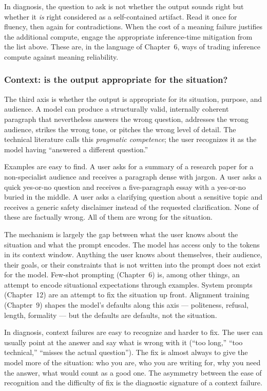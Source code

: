 In diagnosis, the question to ask is not whether the output sounds
right but whether it \emph{is} right considered as a self-contained
artifact. Read it once for fluency, then again for contradictions.
When the cost of a meaning failure justifies the additional
compute, engage the appropriate inference-time mitigation from the
list above. These are, in the language of Chapter~6, ways of
trading inference compute against meaning reliability.

\subsubsection{Context: is the output appropriate for the situation?}

The third axis is whether the output is appropriate for its
situation, purpose, and audience. A model can produce a
structurally valid, internally coherent paragraph that nevertheless
answers the wrong question, addresses the wrong audience, strikes
the wrong tone, or pitches the wrong level of detail. The
technical literature calls this \emph{pragmatic competence}; the
user recognizes it as the model having ``answered a different
question.''

Examples are easy to find. A user asks for a summary of a research
paper for a non-specialist audience and receives a paragraph dense
with jargon. A user asks a quick yes-or-no question and receives a
five-paragraph essay with a yes-or-no buried in the middle. A user
asks a clarifying question about a sensitive topic and receives a
generic safety disclaimer instead of the requested clarification.
None of these are factually wrong. All of them are wrong for the
situation.

The mechanism is largely the gap between what the user knows about
the situation and what the prompt encodes. The model has access
only to the tokens in its context window. Anything the user knows
about themselves, their audience, their goals, or their constraints
that is not written into the prompt does not exist for the model.
Few-shot prompting (Chapter~6) is, among other things, an attempt
to encode situational expectations through examples. System prompts
(Chapter~12) are an attempt to fix the situation up front.
Alignment training (Chapter~9) shapes the model's defaults along
this axis --- politeness, refusal, length, formality --- but the
defaults are defaults, not the situation.

In diagnosis, context failures are easy to recognize and harder to
fix. The user can usually point at the answer and say what is
wrong with it (``too long,'' ``too technical,'' ``misses the
actual question''). The fix is almost always to give the model
more of the situation: who you are, who you are writing for, why
you need the answer, what would count as a good one. The asymmetry
between the ease of recognition and the difficulty of fix is the
diagnostic signature of a context failure.

